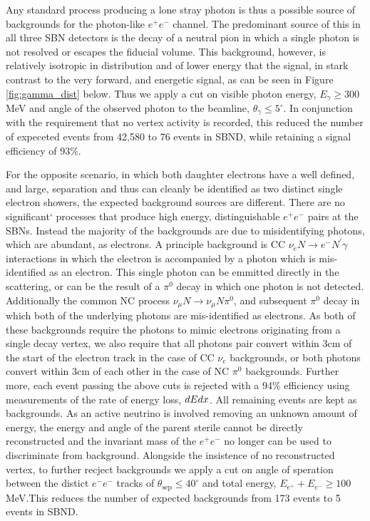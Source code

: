 \documentclass[11pt, a4paper]{article}
\begin{document}
Any standard process producing a lone stray photon is thus a possible source of backgrounds for the photon-like $e^+e^-$ channel. The predominant source of this in all three SBN detectors is the decay of a neutral pion in which a single photon is not resolved or escapes the fiducial volume. This background, however, is relatively isotropic in distribution and of lower energy that the signal, in stark contrast to the very forward, and energetic signal, as can be seen in Figure \ref{fig:gamma_dist} below. Thus we apply a cut on visible photon energy, $E_\gamma \geq 300 $ MeV and angle of the observed photon to the beamline, $\theta_\gamma \leq 5^\circ$. In conjunction with the requirement that no vertex activity is recorded, this reduced the number of expeceted events from 42,580 to 76 events in SBND, while retaining a signal efficiency of 93\%.

For the opposite scenario, in which both daughter electrons have a well defined, and large, separation and thus can cleanly be identified as two distinct single electron showers, the expected background sources are different. There are no significant` processes that produce high energy, distinguishable $e^+e^-$ pairs at the SBNs.  Instead the majority of the backgrounds are due to misidentifying photons, which are abundant, as electrons. A principle background is CC $\nu_e N \rightarrow e^- N^\prime \gamma$ interactions in which the electron is accompanied by a photon which is mis-identified as an electron. This single photon can be emmitted directly in the scattering, or can be the result of a $\pi^0$ decay in which one photon is not detected. Additionally the common NC  process $\nu_\mu N \rightarrow \nu_\mu N \pi^0$, and subsequent $\pi^0$ decay in which both of the underlying photons are mis-identified as electrons. As both of these backgrounds require the photons to mimic electrons originating from a single decay vertex, we also require that all photons pair convert within 3cm of the start of the electron track in the case of CC $\nu_e$ backgrounds, or both photons convert within 3cm of each other in the case of NC $\pi^0$ backgrounds. Further more, each event passing the above cuts is rejected with a 94\% efficiency using measurements of the rate of energy loss, $dE\/dx$. All remaining events are kept as backgrounds. As an active neutrino is involved removing an unknown amount of energy, the energy and angle of the parent sterile cannot be directly reconstructed and the invariant mass of the $e^+ e^-$ no longer can be used to discriminate from background. Alongside the insistence of no reconstructed vertex, to further recject backgrounds we apply a cut on angle of speration between the distict $e^-e^-$ tracks of $\theta_\text{sep}\leq 40 ^\circ$ and total energy, $E_{e^+}+E_{e^-} \geq 100$ MeV.This reduces the number of expected backgrounds from 173 events to 5 events in SBND. 
\end{document}
